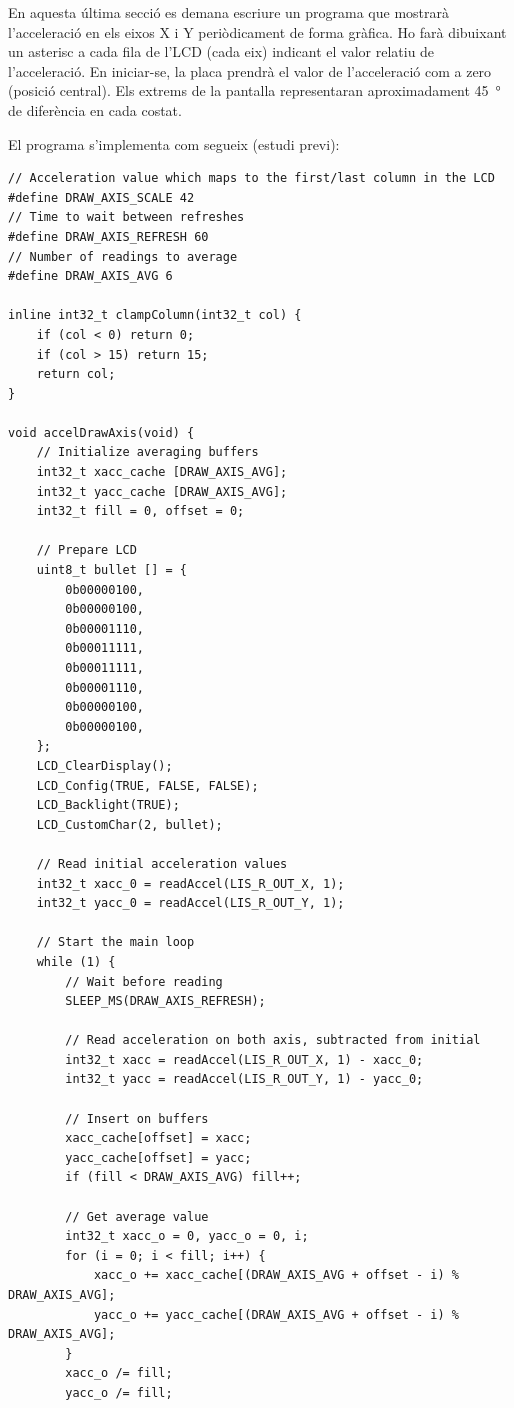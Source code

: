 En aquesta última secció es demana escriure un programa que mostrarà l'acceleració en els
eixos X i Y periòdicament de forma gràfica. Ho farà dibuixant un asterisc a cada fila de
l'LCD (cada eix) indicant el valor relatiu de l'acceleració. En iniciar-se, la placa prendrà
el valor de l'acceleració com a zero (posició central). Els extrems de la pantalla representaran
aproximadament \SI{45}{\degree} de diferència en cada costat.

El programa s'implementa com segueix (estudi previ):

\begin{verbatim}
// Acceleration value which maps to the first/last column in the LCD
#define DRAW_AXIS_SCALE 42
// Time to wait between refreshes
#define DRAW_AXIS_REFRESH 60
// Number of readings to average
#define DRAW_AXIS_AVG 6

inline int32_t clampColumn(int32_t col) {
    if (col < 0) return 0;
    if (col > 15) return 15;
    return col;
}

void accelDrawAxis(void) {
    // Initialize averaging buffers
    int32_t xacc_cache [DRAW_AXIS_AVG];
    int32_t yacc_cache [DRAW_AXIS_AVG];
    int32_t fill = 0, offset = 0;

    // Prepare LCD
    uint8_t bullet [] = {
        0b00000100,
        0b00000100,
        0b00001110,
        0b00011111,
        0b00011111,
        0b00001110,
        0b00000100,
        0b00000100,
    };
    LCD_ClearDisplay();
    LCD_Config(TRUE, FALSE, FALSE);
    LCD_Backlight(TRUE);
    LCD_CustomChar(2, bullet);

    // Read initial acceleration values
    int32_t xacc_0 = readAccel(LIS_R_OUT_X, 1);
    int32_t yacc_0 = readAccel(LIS_R_OUT_Y, 1);

    // Start the main loop
    while (1) {
        // Wait before reading
        SLEEP_MS(DRAW_AXIS_REFRESH);

        // Read acceleration on both axis, subtracted from initial
        int32_t xacc = readAccel(LIS_R_OUT_X, 1) - xacc_0;
        int32_t yacc = readAccel(LIS_R_OUT_Y, 1) - yacc_0;

        // Insert on buffers
        xacc_cache[offset] = xacc;
        yacc_cache[offset] = yacc;
        if (fill < DRAW_AXIS_AVG) fill++;

        // Get average value
        int32_t xacc_o = 0, yacc_o = 0, i;
        for (i = 0; i < fill; i++) {
            xacc_o += xacc_cache[(DRAW_AXIS_AVG + offset - i) % DRAW_AXIS_AVG];
            yacc_o += yacc_cache[(DRAW_AXIS_AVG + offset - i) % DRAW_AXIS_AVG];
        }
        xacc_o /= fill;
        yacc_o /= fill;


\end{verbatim}
